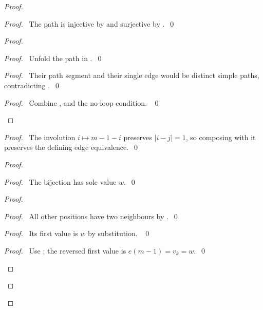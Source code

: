 \begin{proof}
\begin{proof}\pf\ The path is injective by  and
surjective by .~\qed\end{proof}
\begin{proof}
\begin{proof}\pf\ Unfold the path in .~\qed\end{proof}
\begin{proof}\pf\ Their path segment and their single edge would be
distinct simple paths, contradicting .~\qed\end{proof}
\qedstep
\begin{proof}\pf\ Combine , 
and the no-loop condition. ~\qed\end{proof}
\end{proof}
\begin{proof}\pf\ The involution $i\mapsto m-1-i$ preserves
$|i-j|=1$, so composing with it preserves the defining edge equivalence.~\qed\end{proof}
\begin{proof}
\begin{proof}\pf\ The bijection  has sole value $w$.~\qed\end{proof}
\begin{proof}
\begin{proof}\pf\ All other positions have two neighbours by
.~\qed\end{proof}
\begin{proof}\pf\ Its first value is $w$ by substitution. ~\qed\end{proof}
\begin{proof}\pf\ Use ; the reversed first
value is $e(m-1)=v_k=w$.~\qed\end{proof}
\qedstep

\end{proof}
\end{proof}
\end{proof}
